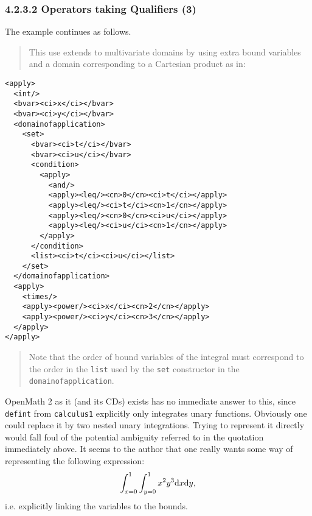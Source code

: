 \documentclass{llncs}
\begin{document}
{\subsubsection{4.2.3.2 Operators taking Qualifiers (3)}\label{42323}
The example continues as follows.
\begin{quotation}\noindent
This use extends to multivariate domains by using extra bound variables and a
domain corresponding to a Cartesian product as in:
\end{quotation}
\begin{lstlisting}[language=MathML2]
<apply>
  <int/>
  <bvar><ci>x</ci></bvar>
  <bvar><ci>y</ci></bvar>
  <domainofapplication>
    <set>
      <bvar><ci>t</ci></bvar>
      <bvar><ci>u</ci></bvar>
      <condition>
        <apply>
          <and/>
          <apply><leq/><cn>0</cn><ci>t</ci></apply>
          <apply><leq/><ci>t</ci><cn>1</cn></apply>
          <apply><leq/><cn>0</cn><ci>u</ci></apply>
          <apply><leq/><ci>u</ci><cn>1</cn></apply>
        </apply>
      </condition>
      <list><ci>t</ci><ci>u</ci></list>
    </set>
  </domainofapplication>
  <apply>
    <times/>
    <apply><power/><ci>x</ci><cn>2</cn></apply>
    <apply><power/><ci>y</ci><cn>3</cn></apply>
  </apply>
</apply>
\end{lstlisting}
\begin{quotation}\noindent
Note that the order of bound variables of the integral must correspond to the
order in the {\tt list} used by the {\tt set} constructor in the {\tt
domainofapplication}. 
\end{quotation}
OpenMath 2 as it (and its CDs) exists has no immediate answer to this, since
{\tt defint} from {\tt calculus1} explicitly only integrates unary functions.
Obviously one could replace it by two nested unary integrations. Trying to
represent it directly would fall foul of the potential ambiguity referred to
in the quotation immediately above. It seems to the author that one really
wants some way of representing the following expression:
\begin{equation}
\int_{x=0}^1\int_{y=0}^1x^2y^3{\rm d}x{\rm d}y,
\end{equation}
i.e. explicitly linking the variables to the bounds.
}
\end{document}

